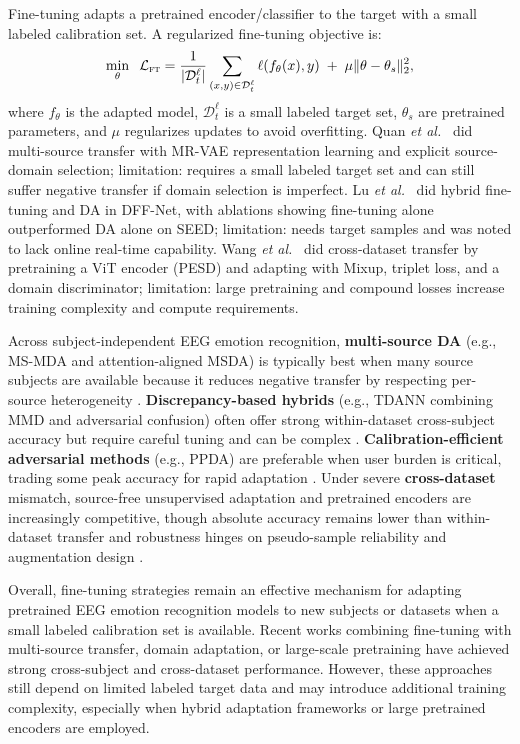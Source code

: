 \documentclass{WileyMSP-template}
\begin{document}
Fine-tuning adapts a pretrained encoder/classifier to the target with a small labeled calibration set. A regularized fine-tuning objective is:
\begin{equation}
\min_{\theta}\;\; \mathcal{L}_{\textsc{ft}}
=\frac{1}{|\mathcal{D}_t^{\ell}|}\sum_{(x,y)\in\mathcal{D}_t^{\ell}} \ell\!\left(f_{\theta}(x),y\right)\;+\;\mu \|\theta-\theta_s\|_2^2,
\label{eq:ft_subjectind}
\end{equation}
where $f_{\theta}$ is the adapted model, $\mathcal{D}_t^{\ell}$ is a small labeled target set, $\theta_s$ are pretrained parameters, and $\mu$ regularizes updates to avoid overfitting. Quan \textit{et al.}~\cite{quan2023bspc_multisource_transfer} did multi-source transfer with MR-VAE representation learning and explicit source-domain selection; limitation: requires a small labeled target set and can still suffer negative transfer if domain selection is imperfect. Lu \textit{et al.}~\cite{lu2023frontiers_dffnet} did hybrid fine-tuning and DA in DFF-Net, with ablations showing fine-tuning alone outperformed DA alone on SEED; limitation: needs target samples and was noted to lack online real-time capability. Wang \textit{et al.}~\cite{wang2025eswa_pesd} did cross-dataset transfer by pretraining a ViT encoder (PESD) and adapting with Mixup, triplet loss, and a domain discriminator; limitation: large pretraining and compound losses increase training complexity and compute requirements.

Across subject-independent EEG emotion recognition, \textbf{multi-source DA} (e.g., MS-MDA and attention-aligned MSDA) is typically best when many source subjects are available because it reduces negative transfer by respecting per-source heterogeneity \cite{chen2021frontiers_msmda,yang2024ssaamsda}. \textbf{Discrepancy-based hybrids} (e.g., TDANN combining MMD and adversarial confusion) often offer strong within-dataset cross-subject accuracy but require careful tuning and can be complex \cite{bao2021frontiers_tdann}. \textbf{Calibration-efficient adversarial methods} (e.g., PPDA) are preferable when user burden is critical, trading some peak accuracy for rapid adaptation \cite{zhao2021aaai_ppda}. Under severe \textbf{cross-dataset} mismatch, source-free unsupervised adaptation and pretrained encoders are increasingly competitive, though absolute accuracy remains lower than within-dataset transfer and robustness hinges on pseudo-sample reliability and augmentation design \cite{imtiaz2025compbiomed_uda_gptds,wang2025eswa_pesd}. 

Overall, fine-tuning strategies remain an effective mechanism for adapting pretrained EEG emotion recognition models to new subjects or datasets when a small labeled calibration set is available. Recent works combining fine-tuning with multi-source transfer, domain adaptation, or large-scale pretraining have achieved strong cross-subject and cross-dataset performance. However, these approaches still depend on limited labeled target data and may introduce additional training complexity, especially when hybrid adaptation frameworks or large pretrained encoders are employed.
\end{document}

